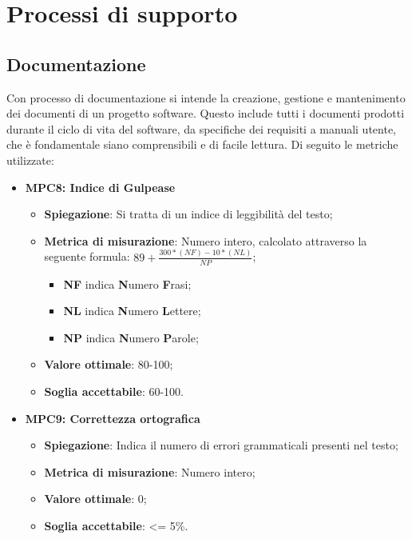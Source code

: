 \section{Processi di supporto}


\subsection{Documentazione}
Con processo di documentazione si intende la creazione, gestione e mantenimento dei documenti di un progetto software. Questo include tutti i documenti prodotti durante il ciclo di vita del software, da specifiche dei requisiti a manuali utente, che è fondamentale siano comprensibili e di facile lettura. Di seguito le metriche utilizzate:
\begin{itemize}
    \item \textbf{MPC8: Indice di Gulpease}
    \begin{itemize}
        \item \textbf{Spiegazione}: Si tratta di un indice di leggibilità del testo;
        \item \textbf{Metrica di misurazione}: Numero intero, calcolato attraverso la seguente formula: \textbf{$89 + \frac{300*(NF)-10*(NL)}{NP}$};
            \begin{itemize}
                \item \textbf{NF} indica \textbf{N}umero \textbf{F}rasi;
                \item \textbf{NL} indica \textbf{N}umero \textbf{L}ettere;
                \item \textbf{NP} indica \textbf{N}umero \textbf{P}arole;
            \end{itemize}
        \item \textbf{Valore ottimale}: 80-100;
        \item \textbf{Soglia accettabile}: 60-100.
    \end{itemize}
\end{itemize}

\begin{itemize}
    \item \textbf{MPC9: Correttezza ortografica}
    \begin{itemize}
        \item \textbf{Spiegazione}: Indica il numero di errori grammaticali presenti nel testo;
        \item \textbf{Metrica di misurazione}: Numero intero;
        \item \textbf{Valore ottimale}: 0;
        \item \textbf{Soglia accettabile}: <= 5\%.
    \end{itemize}
\end{itemize}

